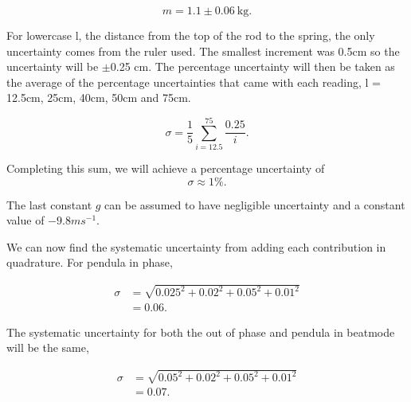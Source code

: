\documentclass{article}
\begin{document}
\begin{equation}
    m = 1.1 \pm 0.06 \: \text{kg}.
\end{equation}

For lowercase l, the distance from the top of the rod to the spring, the only uncertainty comes 
from the ruler used. The smallest increment was 0.5cm so the uncertainty will be $\pm$0.25 cm.
The percentage uncertainty will then be taken as the average of the percentage uncertainties 
that came with each reading, l = 12.5cm, 25cm, 40cm, 50cm and 75cm.

\begin{equation}
    \sigma = \frac{1}{5}\sum_{i=12.5}^{75}\frac{0.25}{i}.
\end{equation}

Completing this sum, we will achieve a percentage uncertainty of
\begin{equation}
    \sigma \approx 1\%.
\end{equation}

The last constant $g$ can be assumed to have negligible uncertainty and a constant value of 
$-9.8ms^{-1}$.

We can now find the systematic uncertainty from adding each contribution 
in quadrature. For pendula in phase,

\begin{equation} \label{eqn:sys1}
    \begin{split}
        \sigma &= \sqrt{0.025^2+0.02^2+0.05^2+0.01^2} \\
        &= 0.06.
    \end{split}
\end{equation}

The systematic uncertainty for both the out of phase and pendula in beatmode
will be the same,

\begin{equation}
    \begin{split}
        \sigma &= \sqrt{0.05^2+0.02^2+0.05^2+0.01^2} \\
        &= 0.07.
    \end{split}
\end{equation}
\end{document}
